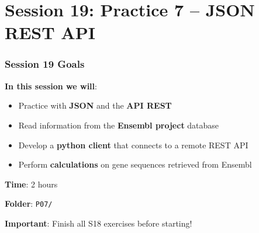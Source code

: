 \documentclass[xcolor=table]{beamer}
\begin{document}

\section{Session 19: Practice 7 -- JSON REST API}

\begin{frame}
\frametitle{Session 19 Goals}

\textbf{In this session we will}:

\begin{itemize}
\item Practice with \textbf{JSON} and the \textbf{API REST}
\item Read information from the \textbf{Ensembl project} database
\item Develop a \textbf{python client} that connects to a remote REST API
\item Perform \textbf{calculations} on gene sequences retrieved from Ensembl
\end{itemize}

\vspace{0.4cm}

\textbf{Time}: 2 hours

\vspace{0.2cm}

\textbf{Folder}: \texttt{P07/}

\vspace{0.2cm}

\textbf{Important}: Finish all S18 exercises before starting!

\end{frame}
\end{document}
